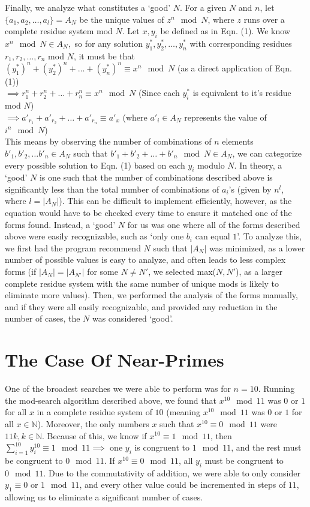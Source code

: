 \documentclass{article}
\begin{document}
\begin{flushleft}
Finally, we analyze what constitutes a `good' $N$. For a given $N$ and $n$, let $\{a_1, a_2, \ldots, a_l\} = A_N$ be the unique values of $z^n \mod N$, where $z$ runs over a complete residue system mod $N$. Let $x, y_i$ be defined as in Eqn. (1). We know $x^n \mod N \in A_N,$ so for any solution $y^*_1, y^*_2, \ldots, y^*_n$ with corresponding residues $r_1, r_2, \ldots, r_n$ mod $N$, it must be that $(y^*_1)^n + (y^*_2)^n + \ldots + (y^*_n)^n \equiv x^n \mod N$ (as a direct application of Eqn. (1)) \\
$\implies r_1^n + r_2^n + \ldots + r_n^n \equiv x^n \mod N$ (Since each $y^*_i$ is equivalent to it's residue mod $N$) \\
$\implies a'_{r_1} + a'_{r_2} + \ldots + a'_{r_n} \equiv a'_{x}$ (where $a'_{i} \in A_N$ represents the value of $i^n \mod N$) \\
This means by observing the number of combinations of $n$ elements $b'_1, b'_2, \ldots b'_n \in A_N$ such that $b'_1 + b'_2 + \ldots + b'_n \mod N \in A_N$, we can categorize every possible solution to Eqn. (1) based on each $y_i$ modulo $N$. In theory, a `good' $N$ is one such that the number of combinations described above is significantly less than the total number of combinations of $a_i$'s (given by $n^l$, where $l = |A_N|$). This can be difficult to implement efficiently, however, as the equation would have to be checked every time to ensure it matched one of the forms found. Instead, a `good' $N$ for us was one where all of the forms described above were easily recognizable, such as `only one $b_i$ can equal $1$'. To analyze this, we first had the program recommend $N$ such that $|A_N|$ was minimized, as a lower number of possible values is easy to analyze, and often leads to less complex forms (if $|A_N| = |A_{N'}|$ for some $N \neq N'$, we selected max($N, N'$), as a larger complete residue system with the same number of unique mods is likely to eliminate more values). Then, we performed the analysis of the forms manually, and if they were all easily recognizable, and provided any reduction in the number of cases, the $N$ was considered `good'.

\section{The Case Of Near-Primes}

One of the broadest searches we were able to perform was for $n = 10$. Running the mod-search algorithm described above, we found that $x^{10} \mod 11$ was $0$ or $1$ for all $x$ in a complete residue system of $10$ (meaning $x^{10} \mod 11$ was $0$ or $1$ for all $x \in \mathbb{N}$). Moreover, the only numbers $x$ such that $x^{10} \equiv 0 \mod 11$ were $11k, k \in \mathbb{N}$. Because of this, we know if $x^{10} \equiv 1 \mod 11$, then $\sum^{10}_{i=1}y_i^{10} \equiv 1 \mod 11 \implies$ one $y_i$ is congruent to $1 \mod 11$, and the rest must be congruent to $0 \mod 11$. If $x^{10} \equiv 0 \mod 11$, all $y_i$ must be congruent to $0 \mod 11$. Due to the commutativity of addition, we were able to only consider $y_1 \equiv 0$ or $1 \mod 11$, and every other value could be incremented in steps of $11$, allowing us to eliminate a significant number of cases.


\end{flushleft}
\end{document}
